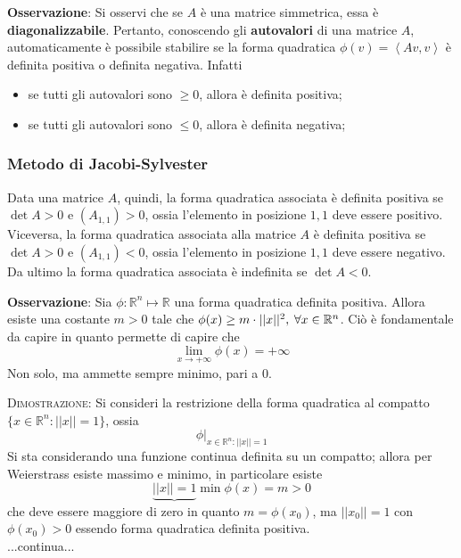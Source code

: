 \documentclass[a4paper]{extarticle}
\begin{document}
\vspace{1em}
\noindent
\textbf{Osservazione}: Si osservi che se $A$ è una matrice simmetrica, essa è \textbf{diagonalizzabile}. Pertanto, conoscendo gli \textbf{autovalori} di una matrice $A$, automaticamente è possibile stabilire se la forma quadratica $\phi(v) = \left<Av,v\right>$ è definita positiva o definita negativa. Infatti
\begin{itemize}
    \item se tutti gli autovalori sono $\geq 0$, allora è definita positiva;
    \item se tutti gli autovalori sono $\leq 0$, allora è definita negativa;
\end{itemize}

\vspace{1em}
\noindent
\subsubsection{Metodo di Jacobi-Sylvester}
Data una matrice $A$, quindi, la forma quadratica associata è definita positiva se $\det A > 0$ e $(A_{1,1}) > 0$, ossia l'elemento in posizione $1,1$ deve essere positivo.\\
Viceversa, la forma quadratica associata alla matrice $A$ è definita positiva se $\det A > 0$ e $(A_{1,1}) < 0$, ossia l'elemento in posizione $1,1$ deve essere negativo.\\
Da ultimo la forma quadratica associata è indefinita se $\det A < 0$.

\vspace{1em}
\noindent
\textbf{Osservazione}: Sia $\phi : \mathbb{R}^n \longmapsto \mathbb{R}$ una forma quadratica definita positiva. Allora esiste una costante $m > 0$ tale che $\phi(x) \geq m \cdot \vert \vert x \vert \vert^2, \hspace{0.25em} \forall x \in \mathbb{R}^n$. Ciò è fondamentale da capire in quanto permette di capire che
\[\lim_{x \to +\infty} \phi(x) = +\infty\]
Non solo, ma ammette sempre minimo, pari a $0$.

\vspace{2em}
\noindent
\normalfont \normalsize
\textsc{Dimostrazione}: Si consideri la restrizione della forma quadratica al compatto $\{x \in \mathbb{R}^n : \vert \vert x \vert \vert = 1\}$, ossia
\[\phi \vert_{x \in \mathbb{R}^n : \vert \vert x \vert \vert = 1}\]
Si sta considerando una funzione continua definita su un compatto; allora per Weierstrass esiste massimo e minimo, in particolare esiste
\[\underbrace{\vert \vert x \vert \vert = 1}{\min \phi(x)} = m > 0\]
che deve essere maggiore di zero in quanto $m = \phi(x_0)$, ma $\vert \vert x_0 \vert \vert = 1$ con $\phi(x_0)>0$ essendo forma quadratica definita positiva.\\
...continua...
\end{document}
